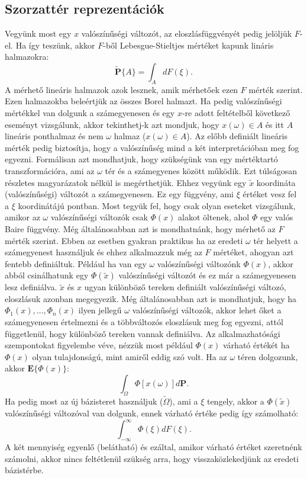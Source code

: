 \documentclass{article}
\begin{document}
\subsection{Szorzattér reprezentációk}

Vegyünk most egy $x$ valószínűségi változót, az eloszlásfüggvényét pedig jelöljük $F$-el. Ha így teszünk, akkor $F$-ből Lebesgue-Stieltjes mértéket kapunk lináris halmazokra: 
\[
	\tilde{\mathrm{\textbf{P}}}\{ A \} = \int_{A} dF(\xi).
\]
A mérhető lineáris halmazok azok lesznek, amik mérhetőek ezen $F$ mérték szerint. Ezen halmazokba beleértjük az összes Borel halmazt. Ha pedig valószínűségi mértékkel van dolgunk a számegyenesen és egy $x$-re adott feltételből következő eseményt vizsgálunk, akkor tekinthetj-k azt mondjuk, hogy $x(\omega) \in A$ és itt $A$ lineáris ponthalmaz és nem $\omega$ halmaz ($x(\omega) \in A$). Az előbb definiált lineáris mérték pedig biztosítja, hogy a valószínűség mind a két interpretációban meg fog egyezni. Formálisan azt mondhatjuk, hogy szükségünk van egy mértéktartó transzformációra, ami az $\omega$ tér és a számegyenes között működik. Ezt túlságosan részletes magyarázatok nélkül is megérthetjük. Ehhez vegyünk egy $\tilde{x}$ koordináta (valószínűségi) változót a számegyenesen. Ez egy függvény, ami $\xi$ értéket vesz fel a $\xi$ koordinátájú pontban. Most tegyük fel, hogy csak olyan eseteket vizsgálunk, amikor az $\omega$ valószínűségi változók csak $\Phi(x)$ alakot öltenek, ahol $\Phi$ egy valós Baire függvény. Még általánosabban azt is mondhatnánk, hogy mérhető az $F$ mérték szerint. Ebben az esetben gyakran praktikus ha az eredeti $\omega$ tér helyett a számegyenest használjuk és ehhez alkalmazzuk még az $F$ mértéket, ahogyan azt fentebb definiáltuk. Például ha van egy $\omega$ valószínűségi változónk $\Phi(x)$, akkor abból csinálhatunk egy $\Phi(\tilde{x})$ valószínűségi változót és ez már a számegyenesen lesz definiálva. $\tilde{x}$ és $x$ ugyan különböző tereken definiált valószínűségi változó, eloszlásuk azonban megegyezik. Még általánosabban azt is mondhatjuk, hogy ha $\Phi_1(x),\ldots,\Phi_n(x)$ ilyen jellegű $\omega$ valószínűségi változók, akkor lehet őket a számegyenesen értelmezni és a többváltozós eloszlásuk meg fog egyezni, attól függetlenül, hogy különböző tereken vannak definiálva. Az alkalmazhatósági szempontokat figyelembe véve, nézzük most például $\Phi(x)$ várható értékét ha $\Phi(x)$ olyan tulajdonságú, mint amiről eddig szó volt. Ha az $\omega$ téren dolgozunk, akkor $\mathrm{\textbf{E}}\{\Phi(x)\}$:
\[
	\int_{\Omega} \Phi\left[x(\omega)\right] d \mathrm{\textbf{P}}.
\]
Ha pedig most az új bázisteret használjuk ($\tilde{\Omega}$), ami a $\xi$ tengely, akkor a $\Phi(\tilde{x})$ valószínűségi változóval van dolgunk, ennek várható értéke pedig így számolható:
\[
	\int_{-\infty}^{\infty} \Phi(\xi) dF(\xi).
\]
A két mennyiség egyenlő (belátható) és ezáltal, amikor várható értéket szeretnénk számolni, akkor nincs feltétlenül szükség arra, hogy visszaközlekedjünk az eredeti bázistérbe.
\end{document}
